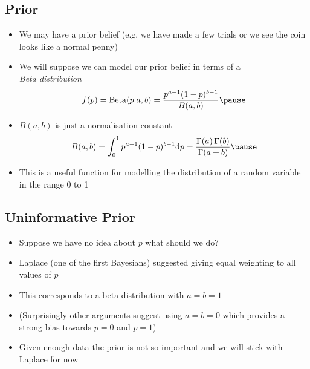 \begin{slide}
\section[-2]{Prior}

\begin{PauseHighLight}
  \begin{itemize}
  \item We may have a prior belief (e.g. we have made a few trials or
    we see the coin looks like a normal penny)\pause
  \item We will suppose we can model our prior belief in terms of a\\
    \emph{Beta distribution}
    \begin{align*}
      f(p) = \mathrm{Beta}(p|a,b) = \frac{p^{a-1}(1-p)^{b-1}}{B(a,b)}\pause
    \end{align*}
  \item $B(a,b)$ is just a normalisation constant
    \begin{align*}
      B(a,b) = \int_0^1 p^{a-1}(1-p)^{b-1} \dd p =
      \frac{\Gamma(a)\,\Gamma(b)}{\Gamma(a+b)} \pause
    \end{align*}
  \item This is a useful function for modelling the distribution of a
    random variable in the range 0 to 1\pause
  \end{itemize}
\end{PauseHighLight}

\end{slide}


\begin{slide}
\section{Uninformative Prior}

\begin{PauseHighLight}
  \begin{itemize}
  \item Suppose we have no idea about $p$ what should we do?\pause
  \item Laplace (one of the first Bayesians) suggested giving equal
    weighting to all values of $p$\pause
  \item This corresponds to a beta distribution with $a=b=1$\pause
  \item (Surprisingly other arguments suggest using $a=b=0$ which
    provides a strong bias towards $p=0$ and $p=1$)\pause
  \item Given enough data the prior is not so important and we will
    stick with Laplace for now\pause
  \end{itemize}
\end{PauseHighLight}

\end{slide}


